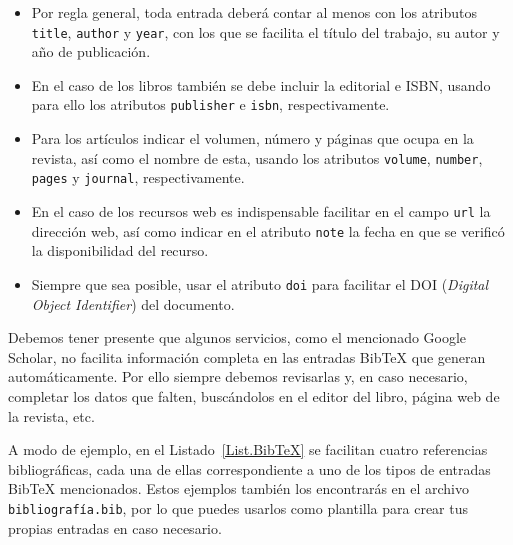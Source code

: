\begin{itemize}
    \item  Por regla general, toda entrada deberá contar al menos con los atributos \texttt{title}, \texttt{author} y \texttt{year}, con los que se facilita el título del trabajo, su autor y año de publicación. 
    
    \item En el caso de los libros también se debe incluir la editorial e ISBN, usando para ello los atributos \texttt{publisher} e \texttt{isbn}, respectivamente.
    
    \item Para los artículos indicar el volumen, número y páginas que ocupa en la revista, así como el nombre de esta, usando los atributos \texttt{volume}, \texttt{number}, \texttt{pages} y \texttt{journal}, respectivamente.
    
    \item En el caso de los recursos web es indispensable facilitar en el campo \texttt{url} la dirección web, así como indicar en el atributo \texttt{note} la fecha en que se verificó la disponibilidad del recurso.
    
    \item Siempre que sea posible, usar el atributo \texttt{doi} para facilitar el DOI (\textit{Digital Object Identifier}) del documento.
\end{itemize}

Debemos tener presente que algunos servicios, como el mencionado Google Scholar, no facilita información completa en las entradas BibTeX que generan automáticamente. Por ello siempre debemos revisarlas y, en caso necesario, completar los datos que falten, buscándolos en el editor del libro, página web de la revista, etc.

A modo de ejemplo, en el Listado~\ref{List.BibTeX} se facilitan cuatro referencias bibliográficas, cada una de ellas correspondiente a uno de los tipos de entradas BibTeX mencionados. Estos ejemplos también los encontrarás en el archivo \texttt{bibliografía.bib}, por lo que puedes usarlos como plantilla para crear tus propias entradas en caso necesario.

